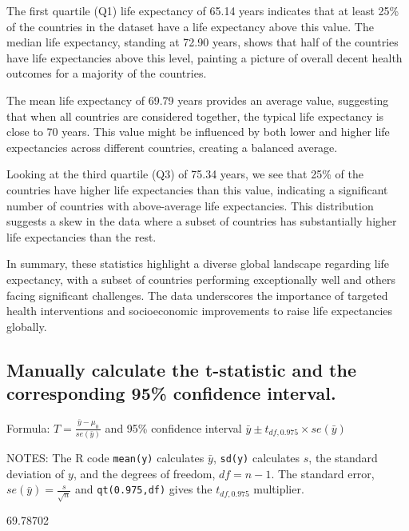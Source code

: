 \documentclass[
]{article}
\newenvironment{Shaded}{\begin{snugshade}}{\end{snugshade}}
\newcommand{\FloatTok}[1]{\textcolor[rgb]{0.00,0.00,0.81}{#1}}
\begin{document}
The first quartile (Q1) life expectancy of 65.14 years indicates that at
least 25\% of the countries in the dataset have a life expectancy above
this value. The median life expectancy, standing at 72.90 years, shows
that half of the countries have life expectancies above this level,
painting a picture of overall decent health outcomes for a majority of
the countries.

The mean life expectancy of 69.79 years provides an average value,
suggesting that when all countries are considered together, the typical
life expectancy is close to 70 years. This value might be influenced by
both lower and higher life expectancies across different countries,
creating a balanced average.

Looking at the third quartile (Q3) of 75.34 years, we see that 25\% of
the countries have higher life expectancies than this value, indicating
a significant number of countries with above-average life expectancies.
This distribution suggests a skew in the data where a subset of
countries has substantially higher life expectancies than the rest.

In summary, these statistics highlight a diverse global landscape
regarding life expectancy, with a subset of countries performing
exceptionally well and others facing significant challenges. The data
underscores the importance of targeted health interventions and
socioeconomic improvements to raise life expectancies globally.

\subsection{Manually calculate the t-statistic and the corresponding
95\% confidence
interval.}\label{manually-calculate-the-t-statistic-and-the-corresponding-95-confidence-interval.}

Formula: \(T = \frac{\bar{y}-\mu_0}{se(\bar{y})}\) and 95\% confidence
interval \(\bar{y} \pm t_{df,0.975} \times se(\bar{y})\)

NOTES: The R code \texttt{mean(y)} calculates \(\bar{y}\),
\texttt{sd(y)} calculates \(s\), the standard deviation of \(y\), and
the degrees of freedom, \(df = n-1\). The standard error,
\(se(\bar{y}) = \frac{s}{\sqrt{n}}\) and \texttt{qt(0.975,df)} gives the
\(t_{df,0.975}\) multiplier.

\begin{Shaded}
\begin{Highlighting}[]
\FloatTok{69.78702}
\end{Highlighting}
\end{Shaded}
\end{document}
